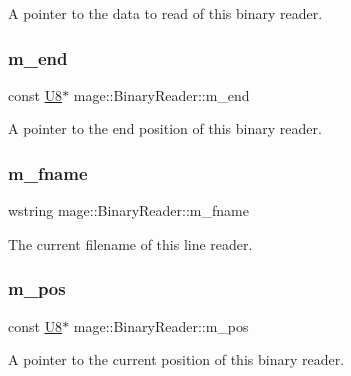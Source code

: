 A pointer to the data to read of this binary reader. \hypertarget{classmage_1_1_binary_reader_a19b0f36cb1e8a05aaa9471514242e8ef}{}\label{classmage_1_1_binary_reader_a19b0f36cb1e8a05aaa9471514242e8ef} 
\subsubsection{\texorpdfstring{m\+\_\+end}{m\_end}}
{\footnotesize\ttfamily const \hyperlink{namespacemage_afc638980bc6154f15af5e2d93a0e0ea9}{U8}$\ast$ mage\+::\+Binary\+Reader\+::m\+\_\+end\hspace{0.3cm}{\ttfamily [private]}}

A pointer to the end position of this binary reader. \hypertarget{classmage_1_1_binary_reader_a9c97c02d53ce60a9952751ad4f55414f}{}\label{classmage_1_1_binary_reader_a9c97c02d53ce60a9952751ad4f55414f} 
\subsubsection{\texorpdfstring{m\+\_\+fname}{m\_fname}}
{\footnotesize\ttfamily wstring mage\+::\+Binary\+Reader\+::m\+\_\+fname\hspace{0.3cm}{\ttfamily [private]}}

The current filename of this line reader. \hypertarget{classmage_1_1_binary_reader_aedb9632de1cf95d5af49499217744ed5}{}\label{classmage_1_1_binary_reader_aedb9632de1cf95d5af49499217744ed5} 
\subsubsection{\texorpdfstring{m\+\_\+pos}{m\_pos}}
{\footnotesize\ttfamily const \hyperlink{namespacemage_afc638980bc6154f15af5e2d93a0e0ea9}{U8}$\ast$ mage\+::\+Binary\+Reader\+::m\+\_\+pos\hspace{0.3cm}{\ttfamily [private]}}

A pointer to the current position of this binary reader. 